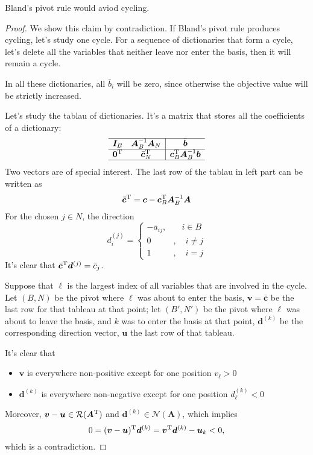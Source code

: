 \begin{theorem}
Bland's pivot rule would aviod cycling.
\end{theorem}
\begin{proof}
We show this claim by contradiction. If Bland's pivot rule produces cycling, let's study one cycle. For a sequence of dictionaries that form a cycle, let's delete all the variables that neither leave nor enter the basis, then it will remain a cycle.

In all these dictionaries, all $\bar{b}_i$ will be zero, since otherwise the objective value will be strictly increased.

Let's study the tablau of dictionaries. It's a matrix that stores all the coefficients of a dictionary:
\[
\begin{array}{cc|c}
\hline
  \bm I_B & \bm A_B^{-1}\bm A_N&\bar{\bm b} \\ \hline
  \bm 0^{\mathrm T}&\bar{\bm c}_N^{\mathrm T}&\bm c_B^{\mathrm T}\bm A_B^{-1}\bm b \\ \hline
\end{array}
\]
Two vectors are of special interest. The last row of the tablau in left part can be written as
\[
\bar{\bm c}^{\mathrm T}=\bm c - \bm c_B^{\mathrm T}\bm A_B^{-1}\bm A
\]
For the chosen $j\in N$, the direction
\[
d_i^{(j)} = \left\{
\begin{aligned}
-\bar{a}_{ij},&\quad i\in B\\
0&,\quad i\ne j\\
1&,\quad i=j
\end{aligned}
\right.
\]
It's clear that $\bar{\bm c}^{\mathrm T} \bm d^{(j)}=\bar{c}_j$.

Suppose that $\ell$ is the largest index of all variables that are involved in the cycle. Let $(B,N)$ be the pivot where $\ell$ was about to enter the basis, $\bm v=\bar{\bm c}$ be the last row for that tableau at that point; let $(B',N')$ be the pivot where $\ell$ was about to leave the basis, and $k$ was to enter the basis at that point, $\bm d^{(k)}$ be the corresponding direction vector, $\bm u$ the last row of that tableau.

It's clear that 
\begin{itemize}
\item
$\bm v$ is everywhere non-positive except for one position $v_\ell>0$
\item
$\bm d^{(k)}$ is everywhere non-negative except for one position $d_\ell^{(k)}<0$
\end{itemize}
Moreover, $\bm v-\bm u\in\mathcal{R}(\bm A^{\mathrm T})$ and $\bm d^{(k)}\in\mathcal{N}(\bm A)$, which implies
\[
0 = (\bm v-\bm u)^{\mathrm T} \bm d^{(k)} = \bm v^{\mathrm T}\bm d^{(k)} - \bm u_k<0,
\]
which is a contradiction.
\end{proof}
